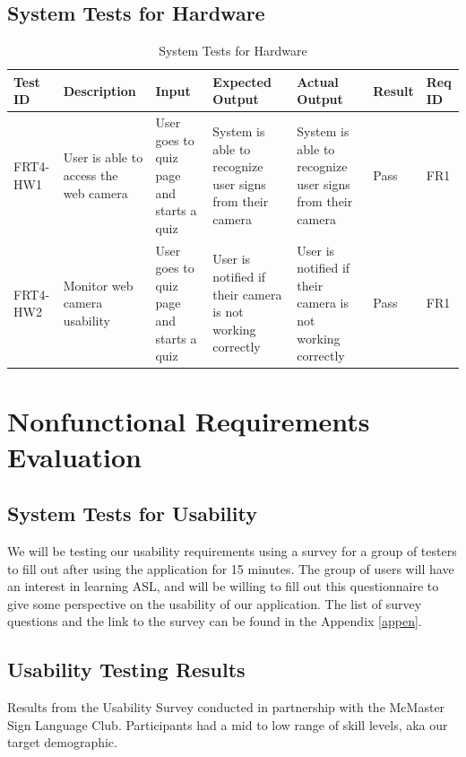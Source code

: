\documentclass[12pt, titlepage]{article}
\begin{document}
\subsection{System Tests for Hardware}
\begin{longtable}{|p{1cm}|p{2.5cm}|p{2cm}|p{2cm}|p{2cm}|p{1.5cm}|p{1cm}|}
\caption{System Tests for Hardware} \\
\hline
\textbf{Test ID} & \textbf{Description} & \textbf{Input} & \textbf{Expected Output} & \textbf{Actual Output} & \textbf{Result} & \textbf{Req ID}\\
\hline
FRT4-HW1 & User is able to access the web camera & User goes to quiz page and starts a quiz & System is able to recognize user signs from their camera & System is able to recognize user signs from their camera & Pass & FR1 \\
\hline
FRT4-HW2 & Monitor web camera usability & User goes to quiz page and starts a quiz & User is notified if their camera is not working correctly & User is notified if their camera is not working correctly & Pass & FR1 \\
\bottomrule
\end{longtable}

\newpage
\section{Nonfunctional Requirements Evaluation}

\subsection{System Tests for Usability}

We will be testing our usability requirements using a survey for a group of testers to fill out after using the application for 15 minutes. The group of users will have an interest in learning ASL, and will be willing to fill out this questionnaire to give some perspective on the usability of our application. The list of survey questions and the link to the survey can be found in the Appendix \ref{appen}.

\subsection{Usability Testing Results}

Results from the Usability Survey conducted in partnership with the McMaster Sign Language Club. Participants had a mid to low range of skill levels, aka our target demographic.
\end{document}
